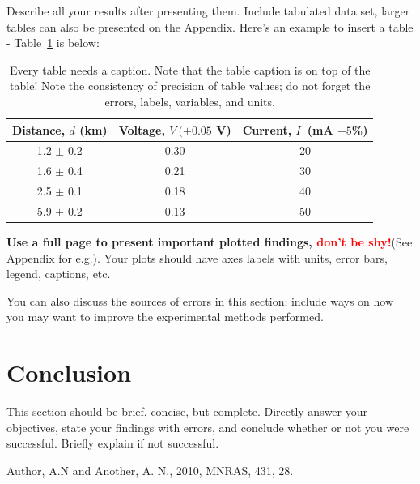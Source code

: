 \documentclass[letterpaper,11pt]{article}
\begin{document}
Describe all your results after presenting them. Include tabulated data set, larger tables can also be presented on the Appendix. Here's an example to insert a table -  Table~\ref{table1} is below:

\begin{table}[ht]
\begin{center}
\caption{Every table needs a caption. Note that the table caption is on top of the table! Note the consistency of precision of table values; do not forget the errors, labels, variables, and units.}
\label{table1} 
\begin{tabular}{ccc} %
\hline
\multicolumn{1}{c}{Distance, $d$ (km) } & \multicolumn{1}{c}{Voltage, $V\ (\pm 0.05$ V)} & \multicolumn{1}{c}{Current, $I$\ (mA $\pm 5$\%)}\\
\hline
1.2 $\pm$ 0.2 &  0.30 & 20 \\
1.6 $\pm$ 0.4 &  0.21 & 30 \\
2.5 $\pm$ 0.1 &  0.18 & 40 \\
5.9 $\pm$ 0.2 &  0.13 & 50 \\
\hline
\end{tabular}
\end{center}
\end{table}

\textbf{Use a full page to present important plotted findings, \textcolor{red}{don't be shy!}}(See Appendix for e.g.). Your plots should have axes labels with units, error bars, legend, captions, etc.

You can also discuss the sources of errors in this section; include ways on how you may want to improve the experimental methods performed. 



\section{Conclusion}
This section should be brief, concise, but complete. Directly answer your objectives, state your findings with errors, and conclude whether or not you were successful. Briefly explain if not successful.

\begin{thebibliography}{99}

Author, A.N and Another, A. N., 2010, MNRAS, 431, 28.

\end{thebibliography}

\appendix
\end{document}
